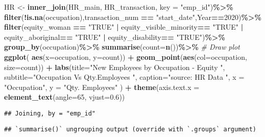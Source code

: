 \documentclass[
]{article}
\newenvironment{Shaded}{\begin{snugshade}}{\end{snugshade}}
\newcommand{\CommentTok}[1]{\textcolor[rgb]{0.56,0.35,0.01}{\textit{#1}}}
\newcommand{\DataTypeTok}[1]{\textcolor[rgb]{0.13,0.29,0.53}{#1}}
\newcommand{\DecValTok}[1]{\textcolor[rgb]{0.00,0.00,0.81}{#1}}
\newcommand{\FloatTok}[1]{\textcolor[rgb]{0.00,0.00,0.81}{#1}}
\newcommand{\KeywordTok}[1]{\textcolor[rgb]{0.13,0.29,0.53}{\textbf{#1}}}
\newcommand{\NormalTok}[1]{#1}
\newcommand{\OperatorTok}[1]{\textcolor[rgb]{0.81,0.36,0.00}{\textbf{#1}}}
\newcommand{\StringTok}[1]{\textcolor[rgb]{0.31,0.60,0.02}{#1}}
\begin{document}
\begin{Shaded}
\begin{Highlighting}[]
\NormalTok{HR \textless{}{-}}\StringTok{ }\KeywordTok{inner\_join}\NormalTok{(HR\_main, HR\_transaction, }\DataTypeTok{key =} \StringTok{"emp\_id"}\NormalTok{)}\OperatorTok{\%\textgreater{}\%}
\KeywordTok{filter}\NormalTok{(}\OperatorTok{!}\KeywordTok{is.na}\NormalTok{(occupation),transaction\_num }\OperatorTok{==}\StringTok{ "start\_date"}\NormalTok{,Year}\OperatorTok{==}\DecValTok{2020}\NormalTok{)}\OperatorTok{\%\textgreater{}\%}
\StringTok{  }\KeywordTok{filter}\NormalTok{(equity\_woman }\OperatorTok{==}\StringTok{ "TRUE"} \OperatorTok{|}\StringTok{ }\NormalTok{equity\_visible\_minority}\OperatorTok{==}\StringTok{ "TRUE"} \OperatorTok{|}\StringTok{ }\NormalTok{equity\_aboriginal}\OperatorTok{==}\StringTok{ "TRUE"} \OperatorTok{|}\StringTok{ }\NormalTok{equity\_disability}\OperatorTok{==}\StringTok{ "TRUE"}\NormalTok{)}\OperatorTok{\%\textgreater{}\%}
\StringTok{   }\KeywordTok{group\_by}\NormalTok{(}\StringTok{\textasciigrave{}}\DataTypeTok{occupation}\StringTok{\textasciigrave{}}\NormalTok{)}\OperatorTok{\%\textgreater{}\%}
\StringTok{   }\KeywordTok{summarise}\NormalTok{(}\DataTypeTok{count=}\KeywordTok{n}\NormalTok{())}\OperatorTok{\%\textgreater{}\%}
\StringTok{   }\CommentTok{\# Draw plot}
\StringTok{  }\KeywordTok{ggplot}\NormalTok{( }\KeywordTok{aes}\NormalTok{(}\DataTypeTok{x=}\NormalTok{occupation, }\DataTypeTok{y=}\NormalTok{count)) }\OperatorTok{+}\StringTok{ }
\StringTok{  }\KeywordTok{geom\_point}\NormalTok{(}\KeywordTok{aes}\NormalTok{(}\DataTypeTok{col=}\NormalTok{occupation, }\DataTypeTok{size=}\NormalTok{count)) }\OperatorTok{+}
\StringTok{  }\KeywordTok{labs}\NormalTok{(}\DataTypeTok{title=}\StringTok{"New Employees by Occupation {-} Equity "}\NormalTok{, }
       \DataTypeTok{subtitle=}\StringTok{"Occupation Vs Qty.Employees "}\NormalTok{, }
       \DataTypeTok{caption=}\StringTok{"source: HR Data "}\NormalTok{,}
       \DataTypeTok{x =} \StringTok{"Occupation"}\NormalTok{, }\DataTypeTok{y =} \StringTok{"Qty. Employees"}\NormalTok{ ) }\OperatorTok{+}\StringTok{ }
\StringTok{  }\KeywordTok{theme}\NormalTok{(}\DataTypeTok{axis.text.x =} \KeywordTok{element\_text}\NormalTok{(}\DataTypeTok{angle=}\DecValTok{65}\NormalTok{, }\DataTypeTok{vjust=}\FloatTok{0.6}\NormalTok{))}
\end{Highlighting}
\end{Shaded}

\begin{verbatim}
## Joining, by = "emp_id"
\end{verbatim}

\begin{verbatim}
## `summarise()` ungrouping output (override with `.groups` argument)
\end{verbatim}
\end{document}
